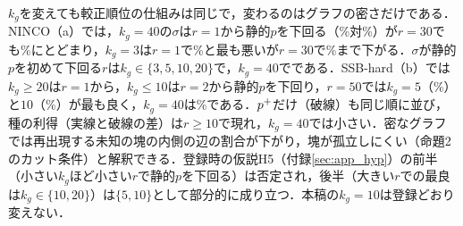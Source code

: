 $k_g$を変えても較正順位の仕組みは同じで，変わるのはグラフの密さだけである．NINCO（a）では，$k_g{=}40$の$\sigma$は$r{=}1$から静的$p$を下回る（\NKgNincoKgFourZeroROneMainFpr\%対\NKgNincoKgOneZeroROneStaticFpr\%）が$r{=}30$でも\NKgNincoKgFourZeroRThreeZeroMainFpr\%にとどまり，$k_g{=}3$は$r{=}1$で\NKgNincoKgThreeROneMainFpr\%と最も悪いが$r{=}30$で\NKgNincoKgThreeRThreeZeroMainFpr\%まで下がる．$\sigma$が静的$p$を初めて下回る$r$は$k_g\in\{3,5,10,20\}$で\NKgNincoKgOneZeroCrossR{}，$k_g{=}40$で\NKgNincoKgFourZeroCrossR{}である．SSB-hard（b）では$k_g\ge20$は$r{=}1$から，$k_g\le10$は$r{=}2$から静的$p$を下回り，$r{=}50$では$k_g{=}5$（\NKgSsbHardKgFiveRmaxMainFpr\%）と$10$（\NKgSsbHardKgOneZeroRmaxMainFpr\%）が最も良く，$k_g{=}40$は\NKgSsbHardKgFourZeroRmaxMainFpr\%である．$p^{+}$だけ（破線）も同じ順に並び，種の利得（実線と破線の差）は$r\ge10$で現れ，$k_g{=}40$では小さい．密なグラフでは再出現する未知の塊の内側の辺の割合が下がり，塊が孤立しにくい（命題2のカット条件）と解釈できる．登録時の仮説H5（付録\ref{sec:app_hyp}）の前半（小さい$k_g$ほど小さい$r$で静的$p$を下回る）は否定され，後半（大きい$r$での最良は$k_g\in\{10,20\}$）は$\{5,10\}$として部分的に成り立つ．本稿の$k_g{=}10$は登録どおり変えない．
